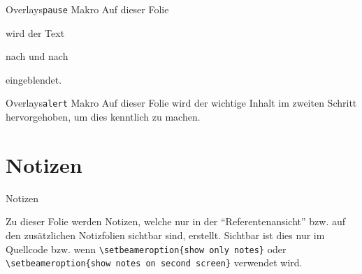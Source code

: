\begin{frame}{Overlays}{\texttt{pause} Makro}
    Auf dieser Folie \pause

    wird der Text \pause

    nach und nach \pause

    eingeblendet.
\end{frame}

\begin{frame}{Overlays}{\texttt{alert} Makro}
    Auf dieser Folie wird der wichtige Inhalt im zweiten Schritt \alert<2>{hervorgehoben}, um dies kenntlich zu machen.
\end{frame}


\section{Notizen} %

\begin{frame}[fragile]{Notizen}

    Zu dieser Folie werden Notizen, welche nur in der \enquote{Referentenansicht} bzw. auf den zusätzlichen Notizfolien sichtbar sind, erstellt. Sichtbar ist dies nur im Quellcode bzw. wenn \verb|\setbeameroption{show only notes}| oder \verb|\setbeameroption{show notes on second screen}| verwendet wird.


\end{frame}




